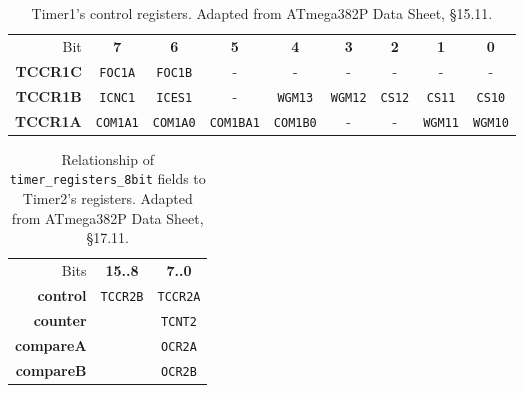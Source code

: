\begin{table}
    \centering \small
    \begin{tabular}{|r||c|c|c|c|c|c|c|c||}
        \hline
        Bit             & \textbf{7}        & \textbf{6}        & \textbf{5}        & \textbf{4}        & \textbf{3}        & \textbf{2}    & \textbf{1}        & \textbf{0}        \\ \cline{2-9}
        \textbf{TCCR1C} & \texttt{FOC1A}    & \texttt{FOC1B}    & -                 & -                 & -                 & -             & -                 & -                 \\
        \textbf{TCCR1B} & \texttt{ICNC1}    & \texttt{ICES1}    & -                 & \texttt{WGM13}    & \texttt{WGM12}    & \texttt{CS12} & \texttt{CS11}     & \texttt{CS10}     \\
        \textbf{TCCR1A} & \texttt{COM1A1}   & \texttt{COM1A0}   & \texttt{COM1BA1}  & \texttt{COM1B0}   & -                 & -             & \texttt{WGM11}    & \texttt{WGM10}    \\ \hline
    \end{tabular}
    \caption{Timer1's control registers. \tiny Adapted from ATmega382P Data Sheet, §15.11. \label{table:Timer1Control}}
\end{table}

\begin{table}
    \centering \small
    \begin{tabular}{|r||c|c||}
        \hline
        Bits                & \textbf{15..8}    & \textbf{7..0}     \\ \cline{2-3}
        \textbf{control}    & \texttt{TCCR2B}   & \texttt{TCCR2A}   \\
        \textbf{counter}    &                   & \texttt{TCNT2}    \\
        \textbf{compareA}   &                   & \texttt{OCR2A}    \\
        \textbf{compareB}   &                   & \texttt{OCR2B}    \\ \hline
    \end{tabular}
    \caption{Relationship of \lstinline{timer_registers_8bit} fields to Timer2's registers. \tiny Adapted from ATmega382P Data Sheet, §17.11. \label{table:Timer2Registers}}
\end{table}

